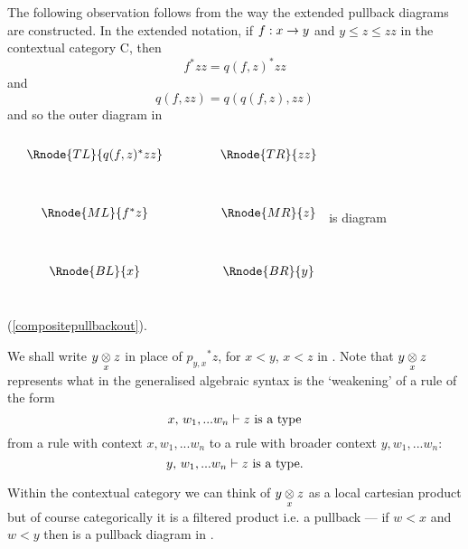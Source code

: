 \note
The following observation
follows from the way the extended pullback diagrams are constructed. 
In the extended notation, if $f: x \morph y$ 
and $y \leq z \leq zz$ in the contextual category C, then
\begin{equation}
f^*zz = q(f, z)^*zz
\end{equation}
 and 
\begin{equation}
q(f, zz) = q(q(f, z), zz)
\end{equation}
and so the outer diagram in
\renewcommand{\pc}[2]{p_{#1,#2}}  %
$
\begin{array}{ccp{.9cm}c}
\\[0.25cm]
&\Rnode{TL}{q(f,z)^*zz} & & \Rnode{TR}{zz}\\ [1.2cm]
&\Rnode{ML}{f^*z} & & \Rnode{MR}{z}\\ [1.2cm]
&\Rnode{BL}{x}         & & \Rnode{BR}{y} \\[1.0cm]
\end{array}
$
is diagram (\ref{compositepullbackout}). 

\note
We shall write $\crossx{y}{z}{x}$ in place of ${p_{y,x}}^*z$, for $x < y$, $x < z$  in \catc. 
Note that
$\crossx{y}{z}{x}$  represents what in the generalised algebraic syntax  is the `weakening' of a rule of the form
\begin{displaymath}
x,\, w_1,...w_n \tstyle \isT{z}
\end{displaymath}
from a rule with context $x, w_1,...w_n$ to a rule with broader context $y, w_1, ... w_n$: 
\begin{displaymath} 
y,\, w_1,...w_n \tstyle \isT{z}.
\end{displaymath}

\noindent Within the contextual category we can think of $\crossx{y}{z}{x}$  as a local cartesian product but of course categorically it is a filtered product i.e. a pullback --- if $w < x$ and $w < y$  then 
\genericcrossxproductdiagram %
is a pullback diagram in \ccat.


